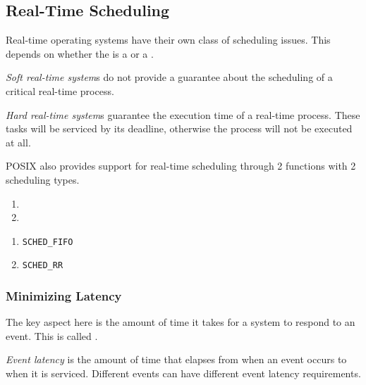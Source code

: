 \subsection{Real-Time Scheduling}\label{subsec:Real_Time_Scheduling}
Real-time operating systems have their own class of scheduling issues.
This depends on whether the  is a  or a .

\begin{definition}\label{def:Soft_Real_Time_System}
  \emph{Soft real-time system}s do not provide a guarantee about the scheduling of a critical real-time process.
\end{definition}

\begin{definition}\label{def:Hard_Real_Time_System}
  \emph{Hard real-time system}s guarantee the execution time of a real-time process.
  These tasks will be serviced by its deadline, otherwise the process will not be executed at all.
\end{definition}

POSIX also provides support for real-time scheduling through 2 functions with 2 scheduling types.
\begin{enumerate}[noitemsep]
\item {}
\item {}
\end{enumerate}
\begin{enumerate}[noitemsep]
\item \texttt{SCHED\_FIFO}
\item \texttt{SCHED\_RR}
\end{enumerate}

\subsubsection{Minimizing Latency}\label{subsubsec:Minimizing_Latency}
The key aspect here is the amount of time it takes for a system to respond to an event.
This is called .

\begin{definition}\label{def:Event_Latency}
  \emph{Event latency} is the amount of time that elapses from when an event occurs to when it is serviced.
  Different events can have different event latency requirements.
\end{definition}

